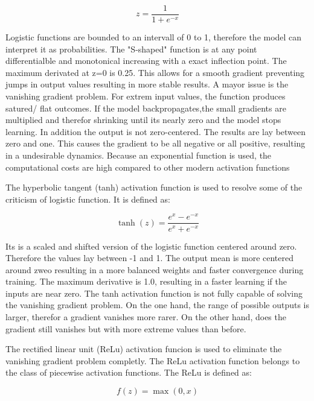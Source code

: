 \begin{equation}
    z = \frac{1}{1 + e^{-x}}
\end{equation}

Logistic functions are bounded to an intervall of 0 to 1, therefore the model can interpret it as probabilities.
The "S-shaped" function is at any point differentialble and monotonical increasing  with a exact inflection point.
The maximum derivated at z=0 is 0.25.
This allows for a smooth gradient preventing jumps in output values resulting in more stable results.
A mayor issue is the vanishing gradient problem.
For extrem input values, the function produces satured/ flat outcomes. 
If the model backpropagates,the small gradients are multiplied and therefor shrinking until its nearly zero and the model stops learning.
In addition the output is not zero-centered. The results are lay between zero and one. 
This causes the gradient to be all negative or all positive, resulting in a undesirable dynamics.
Because an exponential function is used, the computational costs are high compared to other modern activation functions

The hyperbolic tangent (tanh) activation function is used to resolve some of the criticism of logistic function. 
It is defined as: 

\begin{equation}
    \tanh(z) = \frac{e^{x} - e^{-x}}{e^{x} + e^{-x}}
\end{equation}

Its is a scaled and shifted version of the logistic function centered around zero.
Therefore the values lay between -1 and 1. 
The output mean is more centered around zweo resulting in a more balanced weights and faster convergence during training.
The maximum derivative is 1.0, resulting in a faster learning if the inputs are near zero.
The tanh activation function is not fully capable of solving the vanishing gradient problem.
On the one hand, the range of possible outputs is larger, therefor a gradient vanishes more rarer.
On the other hand, does the gradient still vanishes but with more extreme values than before.

The rectified linear unit (ReLu) activation funcion is used to eliminate the vanishing gradient problem completly.
The ReLu activation function belongs to the class of piecewise activation functions.
The ReLu is defined as: 

\begin{equation}
    f(z) = \max(0, x)
\end{equation}

